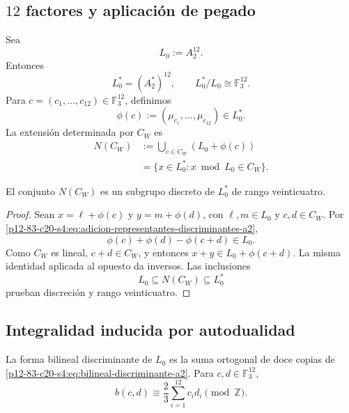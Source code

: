 \subsection{\(12\) factores y aplicación de pegado}

Sea
\[
 L_0:=A_2^{12}.
\]
Entonces
\[
 L_0^*=(A_2^*)^{12},
 \qquad
 L_0^*/L_0\cong\mathbb F_3^{12}.
\]
Para \(c=(c_1,\ldots,c_{12})\in\mathbb F_3^{12}\), definimos
\begin{equation}
 \phi(c):=(\mu_{c_1},\ldots,\mu_{c_{12}})\in L_0^*.
 \label{p12-83-c20-s4:eq:aplicacion-pegado-cw}
\end{equation}
La extensión determinada por \(C_W\) es
\begin{equation}
 \begin{aligned}
 N(C_W)
 &:=\bigcup_{c\in C_W}(L_0+\phi(c))\\
 &=\{x\in L_0^*:x\bmod L_0\in C_W\}.
 \end{aligned}
 \label{p12-83-c20-s4:eq:definicion-niemeier-cw}
\end{equation}

\begin{lemma}
\label{p12-83-c20-s4:lem:clausura-pegado-cw}
El conjunto \(N(C_W)\) es un subgrupo discreto de \(L_0^*\) de rango
veinticuatro.
\end{lemma}

\begin{proof}
Sean \(x=\ell+\phi(c)\) y \(y=m+\phi(d)\), con \(\ell,m\in L_0\) y
\(c,d\in C_W\). Por \eqref{p12-83-c20-s4:eq:adicion-representantes-discriminantes-a2},
\[
 \phi(c)+\phi(d)-\phi(c+d)\in L_0.
\]
Como \(C_W\) es lineal, \(c+d\in C_W\), y entonces
\(x+y\in L_0+\phi(c+d)\). La misma identidad aplicada al opuesto da
inversos. Las inclusiones
\[
 L_0\subseteq N(C_W)\subseteq L_0^*
\]
prueban discreción y rango veinticuatro.
\end{proof}

\subsection{Integralidad inducida por autodualidad}

La forma bilineal discriminante de \(L_0\) es la suma ortogonal de doce
copias de \eqref{p12-83-c20-s4:eq:bilineal-discriminante-a2}. Para
\(c,d\in\mathbb F_3^{12}\),
\begin{equation}
 b(c,d)
 \equiv\frac23\sum_{i=1}^{12}c_id_i
 \pmod{\mathbb Z}.
 \label{p12-83-c20-s4:eq:bilineal-discriminante-a2-doce}
\end{equation}

